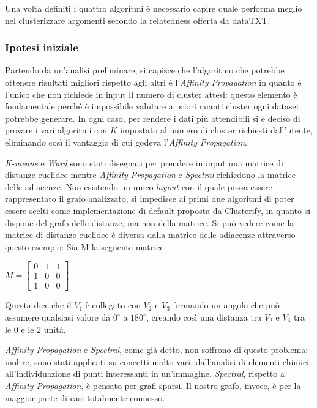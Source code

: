 Una volta definiti i quattro algoritmi è necessario capire quale performa meglio nel clusterizzare argomenti secondo la relatedness offerta da dataTXT.

\subsubsection{Ipotesi iniziale}
Partendo da un'analisi preliminare, si capisce che l'algoritmo che potrebbe ottenere risultati migliori rispetto agli altri è l'\emph{Affinity Propagation} in quanto è l'unico che non richiede in input il numero di cluster attesi: questo elemento è fondamentale perché è impossibile valutare a priori quanti cluster ogni dataset potrebbe generare. In ogni caso, per rendere i dati più attendibili si è deciso di provare i vari algoritmi con $K$ impostato al numero di cluster richiesti dall'utente, eliminando così il vantaggio di cui godeva l'\emph{Affinity Propagation}.

\emph{K-means} e \emph{Ward} sono stati disegnati per prendere in input una matrice di distanze euclidee mentre \emph{Affinity Propagation} e \emph{Spectral} richiedono la matrice delle adiacenze. Non esistendo un unico \emph{layout} con il quale possa essere rappresentato il grafo analizzato, si impedisce ai primi due algoritmi di poter essere scelti come implementazione di default proposta da Clusterify, in quanto si dispone del grafo delle distanze, ma non della matrice. Si può vedere come la matrice di distanze euclidee è diversa dalla matrice delle adiacenze attraverso questo esempio: Sia M la seguente matrice:

\begin{center}
     $M = \begin{bmatrix}
                0 & 1 & 1\\
                1 & 0 & 0\\
                1 & 0 & 0
        \end{bmatrix}$
\end{center}
Questa dice che il $V_1$ è collegato con $V_2$ e $V_3$ formando un angolo che può assumere qualsiasi valore da $0^{\circ}$ a $180^{\circ}$, creando così una distanza tra $V_2$ e $V_3$ tra le $0$ e le $2$ unità.
 
\emph{Affinity Propagation} e \emph{Spectral}, come già detto, non soffrono di questo problema; inoltre, sono stati applicati su concetti molto vari, dall'analisi di elementi chimici all'individuazione di punti interessanti in un'immagine. \emph{Spectral}, rispetto a \emph{Affinity Propagation}, è pensato per grafi sparsi. Il nostro grafo, invece, è per la maggior parte di casi totalmente connesso. 

